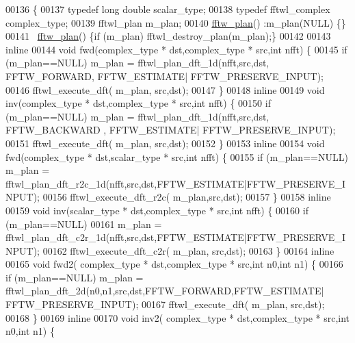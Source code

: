 \begin{DoxyCode}
00136   \{
00137       \textcolor{keyword}{typedef} \textcolor{keywordtype}{long} \textcolor{keywordtype}{double} scalar\_type;
00138       \textcolor{keyword}{typedef} fftwl\_complex complex\_type;
00139       fftwl\_plan m\_plan;
00140       \hyperlink{struct_eigen_1_1internal_1_1fftw__plan}{fftw\_plan}() :m\_plan(NULL) \{\}
00141       ~\hyperlink{struct_eigen_1_1internal_1_1fftw__plan}{fftw\_plan}() \{\textcolor{keywordflow}{if} (m\_plan) fftwl\_destroy\_plan(m\_plan);\}
00142 
00143       \textcolor{keyword}{inline}
00144       \textcolor{keywordtype}{void} fwd(complex\_type * dst,complex\_type * src,\textcolor{keywordtype}{int} nfft) \{
00145           \textcolor{keywordflow}{if} (m\_plan==NULL) m\_plan = fftwl\_plan\_dft\_1d(nfft,src,dst, FFTW\_FORWARD, FFTW\_ESTIMATE|
      FFTW\_PRESERVE\_INPUT);
00146           fftwl\_execute\_dft( m\_plan, src,dst);
00147       \}
00148       \textcolor{keyword}{inline}
00149       \textcolor{keywordtype}{void} inv(complex\_type * dst,complex\_type * src,\textcolor{keywordtype}{int} nfft) \{
00150           \textcolor{keywordflow}{if} (m\_plan==NULL) m\_plan = fftwl\_plan\_dft\_1d(nfft,src,dst, FFTW\_BACKWARD , FFTW\_ESTIMATE|
      FFTW\_PRESERVE\_INPUT);
00151           fftwl\_execute\_dft( m\_plan, src,dst);
00152       \}
00153       \textcolor{keyword}{inline}
00154       \textcolor{keywordtype}{void} fwd(complex\_type * dst,scalar\_type * src,\textcolor{keywordtype}{int} nfft) \{
00155           \textcolor{keywordflow}{if} (m\_plan==NULL) m\_plan = fftwl\_plan\_dft\_r2c\_1d(nfft,src,dst,FFTW\_ESTIMATE|FFTW\_PRESERVE\_INPUT);
00156           fftwl\_execute\_dft\_r2c( m\_plan,src,dst);
00157       \}
00158       \textcolor{keyword}{inline}
00159       \textcolor{keywordtype}{void} inv(scalar\_type * dst,complex\_type * src,\textcolor{keywordtype}{int} nfft) \{
00160           \textcolor{keywordflow}{if} (m\_plan==NULL)
00161               m\_plan = fftwl\_plan\_dft\_c2r\_1d(nfft,src,dst,FFTW\_ESTIMATE|FFTW\_PRESERVE\_INPUT);
00162           fftwl\_execute\_dft\_c2r( m\_plan, src,dst);
00163       \}
00164       \textcolor{keyword}{inline} 
00165       \textcolor{keywordtype}{void} fwd2( complex\_type * dst,complex\_type * src,\textcolor{keywordtype}{int} n0,\textcolor{keywordtype}{int} n1) \{
00166           \textcolor{keywordflow}{if} (m\_plan==NULL) m\_plan = fftwl\_plan\_dft\_2d(n0,n1,src,dst,FFTW\_FORWARD,FFTW\_ESTIMATE|
      FFTW\_PRESERVE\_INPUT);
00167           fftwl\_execute\_dft( m\_plan, src,dst);
00168       \}
00169       \textcolor{keyword}{inline} 
00170       \textcolor{keywordtype}{void} inv2( complex\_type * dst,complex\_type * src,\textcolor{keywordtype}{int} n0,\textcolor{keywordtype}{int} n1) \{

\end{DoxyCode}
